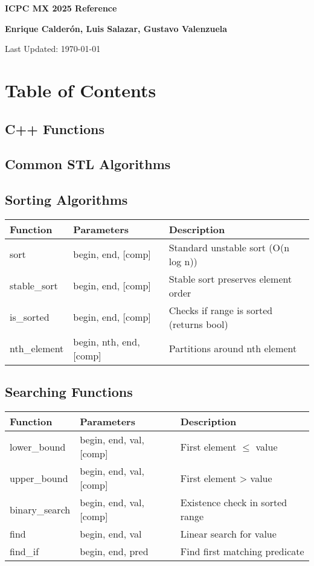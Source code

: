\documentclass[10pt]{article}
\newcommand{\authorname}{\textbf{Enrique Calderón, Luis Salazar, Gustavo Valenzuela}}
\newcommand{\maketitlepage}{
    \begin{titlepage}
        \centering
        \vspace*{2cm}
        {\Huge\bfseries ICPC MX 2025 Reference\par}
        \vspace{1cm}
        {\Large \authorname \par}
        \vspace{2cm}
        {\large Last Updated: \today\par}
        \vfill
    \end{titlepage}
}
\begin{document}
\maketitlepage
\cleardoublepage

\section*{Table of Contents}
\begin{multicols*}{2}
    \startcontents[sections]
\end{multicols*}
\newpage

\begin{multicols*}{2}


\section{C++ Functions}
\subsection{Common STL Algorithms}

\subsection*{Sorting Algorithms}
\begin{tabularx}{\linewidth}{|l|l|X|}
    \hline
    \textbf{Function} & \textbf{Parameters} & \textbf{Description} \\
    \hline
    sort & begin, end, [comp] & Standard unstable sort (O(n log n)) \\
    \hline
    stable\_sort & begin, end, [comp] & Stable sort preserves element order \\
    \hline
    is\_sorted & begin, end, [comp] & Checks if range is sorted (returns bool) \\
    \hline
    nth\_element & begin, nth, end, [comp] & Partitions around nth element \\
    \hline
\end{tabularx}

\subsection*{Searching Functions}
\begin{tabularx}{\linewidth}{|l|l|X|}
    \hline
    \textbf{Function} & \textbf{Parameters} & \textbf{Description} \\
    \hline
    lower\_bound & begin, end, val, [comp] & First element $\leq$ value \\
    \hline
    upper\_bound & begin, end, val, [comp] & First element > value \\
    \hline
    binary\_search & begin, end, val, [comp] & Existence check in sorted range \\
    \hline
    find & begin, end, val & Linear search for value \\
    \hline
    find\_if & begin, end, pred & Find first matching predicate \\
    \hline
\end{tabularx}


\end{multicols*}
\end{document}
